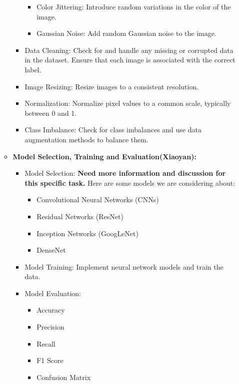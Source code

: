\documentclass[
ngerman,
accentcolor=9c,%
type=intern,
marginpar=false
]{tudapub}
\begin{document}
\begin{itemize}
\begin{itemize}
\begin{itemize}
\begin{itemize}
					\item Color Jittering: Introduce random variations in the color of the image.
					\item Gaussian Noise: Add random Gaussian noise to the image.
				\end{itemize}
				\item Data Cleaning: Check for and handle any missing or corrupted data in the dataset. Ensure that each image is associated with the correct label.
				\item Image Resizing: Resize images to a consistent resolution.
				\item Normalization: Normalize pixel values to a common scale, typically between 0 and 1.
				\item Class Imbalance: Check for class imbalances and use data augmentation methods to balance them.









			\end{itemize}
			\item \textbf{Model Selection, Training and Evaluation(Xiaoyan):}
			\begin{itemize}
				\item Model Selection: \textbf{Need more information and discussion for this specific task.} Here are some models we are considering about:
				\begin{itemize}
					\item Convolutional Neural Networks (CNNs)
					\item Residual Networks (ResNet)
					\item Inception Networks (GoogLeNet)
					\item DenseNet
				\end{itemize}
				\item Model Training: Implement neural network models and train the data.
				\item Model Evaluation:
				\begin{itemize}
					\item Accuracy
					\item Precision
					\item Recall
					\item F1 Score
					\item Confusion Matrix




\end{itemize}
\end{itemize}
\end{itemize}
\end{itemize}
\end{document}
